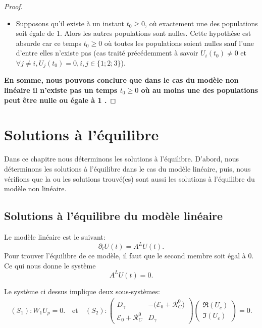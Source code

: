 \documentclass[12pt,a4paper,openany,oneside]{book}
\begin{document}
{{{{{{\begin{proof}
\begin{enumerate}
\begin{itemize}[label=$\bullet$]
\item Supposons qu'il existe à un instant $t_{0}\geq0$, où exactement une des populations soit égale de 1. Alors les autres populations sont nulles.
Cette hypothèse est absurde car ce temps $t_{0}\geq0$  où toutes les populations soient nulles sauf l'une d'entre elles n'existe pas (cas traité précédemment à savoir $ U_{i}(t_{0})\neq 0 $ et $\forall j\neq i, U_{j}(t_{0})=0 , i, j \in \{1;2;3\} $). 
   
 \end{itemize} 
\end{enumerate}
\textbf{En somme, nous pouvons conclure que dans le cas du modèle non linéaire il n'existe pas un temps $t_{0}\geq0$ où au moins une des populations peut \^{e}tre nulle ou égale à 1 .}

\end{proof}


\chapter{Solutions à l'équilibre}
Dans ce chapitre  nous déterminons les solutions à l'équilibre.
D'abord, nous déterminons les solutions à l'équilibre dans le cas du modèle linéaire, puis, nous vérifions que la ou les solutions trouvé(es) sont aussi les solutions à l'équilibre du modèle non linéaire.

\section{Solutions à l'équilibre du modèle linéaire} 
Le modèle linéaire est le suivant:
$$ \partial_{t}U(t)= A^{L}U(t) .$$
Pour trouver l'équilibre de ce modèle, il faut que le second membre soit égal à 0. Ce qui nous donne le système 
$$
 A^{L}U(t)=0 .
$$

Le système ci dessus implique deux sous-systèmes:
 \begin{eqnarray*}
  (S_{1}): W_{1}U_{p}=0 . \quad \textrm{et}\quad 
  (S_{2}):
  \begin{pmatrix}
D_{\gamma}                &  -\big(\mathcal{E}_{0}+ \mathcal{R}^{0}_{C}\big)  \\
\mathcal{E}_{0}+ \mathcal{R}^{0}_{C}  &  D_{\gamma}
\end{pmatrix}\begin{pmatrix}\Re(U_{c})\\ \Im(U_{c})\end{pmatrix} = 0.
\end{eqnarray*}

}}}}}}
\end{document}
